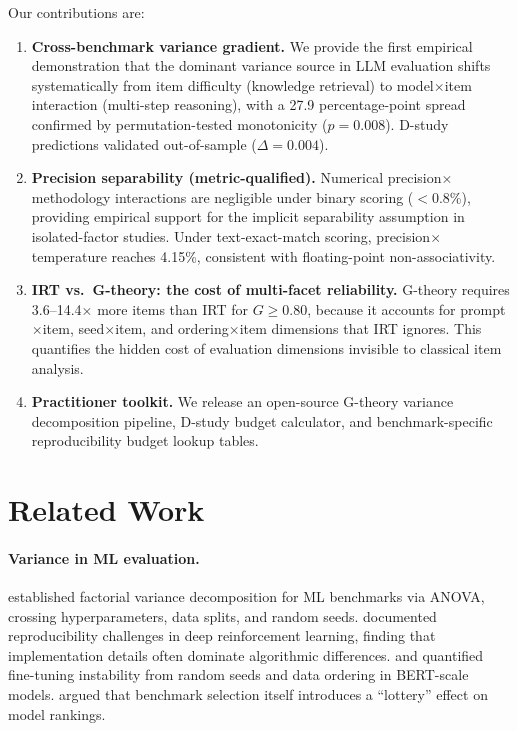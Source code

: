 \documentclass[letterpaper,11pt]{article}
\begin{document}
Our contributions are:
\begin{enumerate}
    \item \textbf{Cross-benchmark variance gradient.} We provide the first empirical demonstration that the dominant variance source in LLM evaluation shifts systematically from item difficulty (knowledge retrieval) to model$\times$item interaction (multi-step reasoning), with a 27.9 percentage-point spread confirmed by permutation-tested monotonicity ($p=0.008$). D-study predictions validated out-of-sample ($\Delta=0.004$).
    \item \textbf{Precision separability (metric-qualified).} Numerical precision$\times$methodology interactions are negligible under binary scoring ($<$0.8\%), providing empirical support for the implicit separability assumption in isolated-factor studies. Under text-exact-match scoring, precision$\times$temperature reaches 4.15\%, consistent with floating-point non-associativity.
    \item \textbf{IRT vs.\ G-theory: the cost of multi-facet reliability.} G-theory requires 3.6--14.4$\times$ more items than IRT for $G\geq0.80$, because it accounts for prompt$\times$item, seed$\times$item, and ordering$\times$item dimensions that IRT ignores. This quantifies the hidden cost of evaluation dimensions invisible to classical item analysis.
    \item \textbf{Practitioner toolkit.} We release an open-source G-theory variance decomposition pipeline, D-study budget calculator, and benchmark-specific reproducibility budget lookup tables.
\end{enumerate}

\section{Related Work}

\paragraph{Variance in ML evaluation.}
\citet{bouthillier2021accounting} established factorial variance decomposition for ML benchmarks via ANOVA, crossing hyperparameters, data splits, and random seeds.
\citet{henderson2018deep} documented reproducibility challenges in deep reinforcement learning, finding that implementation details often dominate algorithmic differences.
\citet{dodge2020finetuning} and \citet{sellam2022multberts} quantified fine-tuning instability from random seeds and data ordering in BERT-scale models.
\citet{dehghani2021benchmark} argued that benchmark selection itself introduces a ``lottery'' effect on model rankings.
\end{document}
